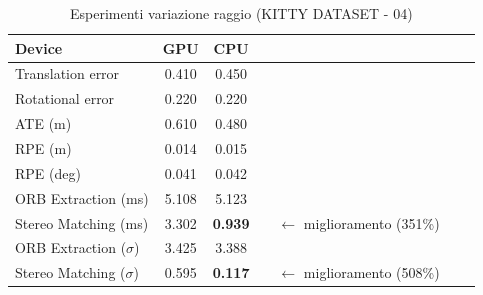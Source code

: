 \documentclass[12pt,a4paper]{report}
\begin{document}
\begin{table}[h]
    \centering
    \caption{Esperimenti variazione raggio (KITTY DATASET - 04) }
    \begin{tabular}{lcccccc}
        \toprule
        \rowcolor{gray!20}
        Device & \cellcolor{blue!20}GPU & \cellcolor{orange!20}CPU  \\
        \midrule
        Translation error & \cellcolor{green!20}0.410 & 0.450  \\
        Rotational error  & \cellcolor{green!20}0.220 & \cellcolor{green!20}0.220  \\
        ATE (m)           & 0.610 & \cellcolor{green!20}0.480  \\
        RPE (m)           & \cellcolor{green!20}0.014 & 0.015  \\
        RPE (deg)         & \cellcolor{green!20}0.041 & 0.042  \\
        ORB Extraction (ms) & \cellcolor{green!20}5.108 & 5.123  \\
        Stereo Matching (ms) & 3.302 & \cellcolor{green!20}\textbf{0.939} && $\xleftarrow{}$ miglioramento (351\%) \\
        ORB Extraction ($\sigma$) & 3.425 & \cellcolor{green!20}3.388  \\
        Stereo Matching ($\sigma$) & 0.595 & \cellcolor{green!20}\textbf{0.117} && $\xleftarrow{}$ miglioramento (508\%)\\
        \bottomrule
    \end{tabular}
\end{table}

\vspace{3cm}
\end{document}
